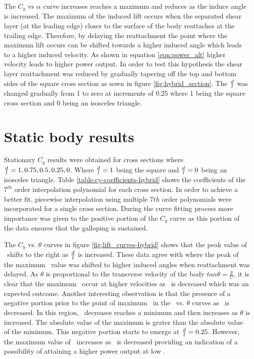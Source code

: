 The $C_y$ vs $\alpha$ curve increases reaches a maximum and reduces as the induce angle is increased. The maximum of the induced lift occurs when the separated  shear layer (at the leading edge) closer to the surface of the body reattaches at the trailing edge. Therefore, by delaying the reattachment the point where the maximum lift occurs can be shifted towards a higher induced angle which leads to a higher induced velocity. As shown in equation \ref{eqn:power_alt} higher velocity leads to higher power output. In order to test this hypothesis the shear layer reattachment was reduced by gradually tapering off the top and bottom sides of the square cross section as sown in figure \ref{fig:hybrid_section}. The $\frac{d}{l}$ was changed gradually from 1 to zero at increments of 0.25 where 1 being the square cross section and 0 being an isosceles triangle.    



\section{Static body results}
 \label{sec:cross-sec-Static body results}


Stationary $C_y$ results were obtained for cross sections where $\frac{d}{l}=1,0.75,0.5,0.25,0$. Where $\frac{d}{l}=1$ being the square and $\frac{d}{l}=0$ being an isosceles  triangle. Table \ref{table:cy-coefficients-hybrid} shows the coefficients of the $7^{th}$ order interpolation polynomial for each cross section. In order to achieve a better fit, piecewise interpolation using multiple $7th$ order polynomials were incorporated for a single cross section. During the curve fitting process more importance was given to the positive portion of the $C_{y}$ curve as this portion of the data ensures that the galloping is sustained. 



The $C_y$ vs. $\theta$ curves in figure \ref{fig:lift_curves-hybrid} shows that the peak value of \cy\ shifts to the right as $\frac{d}{l}$ is increased. These data agree with \citep{Luo1994} where the peak of the maximum \cy\ value was shifted to higher induced angles when reattachment was delayed. As $\theta$ is proportional to the transverse velocity of the body $tan{\theta}=\frac{\dot{y}}{U}$, it is clear that the maximum \cy\ occur at higher velocities as \ratio\ is decreased which was an expected outcome. Another interesting observation is that the presence of a negative portion prior to the point of maximum \cy\ in the \cy\ vs. $\theta$ curves as \ratio\ is decreased. In this region, \cy\ decreases reaches a minimum and then increases as $\theta$ is increased. The absolute value of the maximum is grater than the absolute value of the minimum. This negative portion starts to emerge at $\frac{d}{l}=0.25$. However, the maximum value of \cy\ increases as \ratio\ is decreased providing an indication of a possibility of attaining a higher power output at low \ratio.

